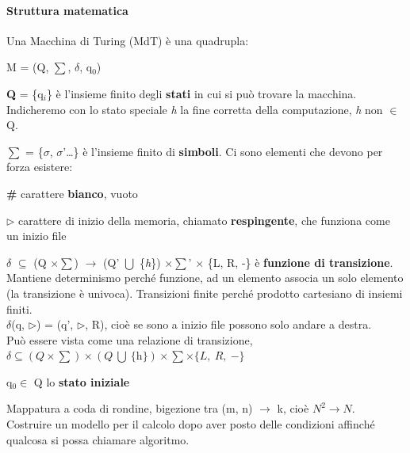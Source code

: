 \documentclass[10pt]{book}
\begin{document}
\paragraph{Struttura matematica} Una Macchina di Turing (MdT) è una quadrupla:
\begin{center}
M = (Q, $\sum$, $\delta$, q$_0$)
\end{center}
\begin{list}{}{}
	\item \textbf{Q} = \{q$_i$\} è l'insieme finito degli \textbf{stati} in cui si può trovare la macchina.\\
	Indicheremo con lo stato speciale \textit{h} la fine corretta della computazione, \textit{h} non $\in$ Q.
	\item $\sum$ = \{$\sigma$, $\sigma$'\ldots\} è l'insieme finito di \textbf{simboli}. 
	Ci sono elementi che devono per forza esistere:
	\begin{list}{}{}
		\item \textbf{\#} carattere \textbf{bianco}, vuoto
		\item $\triangleright$ carattere di inizio della memoria, chiamato \textbf{respingente}, che funziona come un inizio file
	\end{list}
	\item $\delta$ $\subseteq$ (Q $\times \sum$) $\rightarrow$ (Q' $\bigcup$ \{\textit{h}\}) $\times \sum$' $\times$ \{L, R, -\} è \textbf{funzione di transizione}.\\
	Mantiene determinismo perché funzione, ad un elemento associa un solo elemento (la transizione è univoca). Transizioni finite perché prodotto cartesiano di insiemi finiti.\\
$\delta$(q, $\triangleright$) = (q', $\triangleright$, R), cioè se sono a inizio file possono solo andare a destra.\\
Può essere vista come una relazione di transizione, $\delta \subseteq (Q \times \sum) \times (Q\:\bigcup\:\{\textit{h}\}) \times \sum \times \{L,\:R,\: -\}$
	\item q$_0 \in $ Q lo \textbf{stato iniziale} 
\end{list}
Mappatura a coda di rondine, bigezione tra (m, n) $\rightarrow$ k, cioè $N^2 \rightarrow N$.\\
Costruire un modello per il calcolo dopo aver posto delle condizioni affinché qualcosa si possa chiamare algoritmo.
\end{document}
